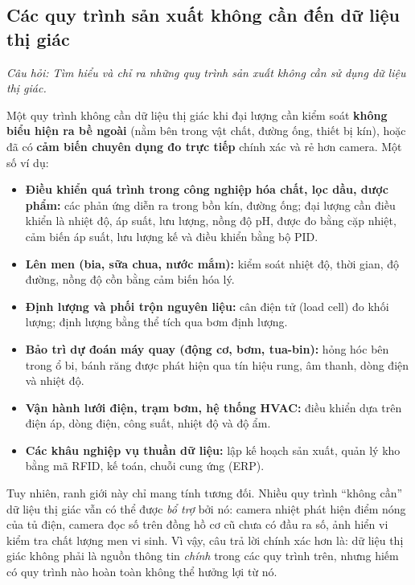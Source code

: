 \subsection{Các quy trình sản xuất không cần đến dữ liệu thị giác}
\label{subsec:w1_novisual}

\textit{Câu hỏi: Tìm hiểu và chỉ ra những quy trình sản xuất không cần sử dụng dữ liệu thị giác.}

Một quy trình không cần dữ liệu thị giác khi đại lượng cần kiểm soát \textbf{không biểu hiện ra bề ngoài} (nằm bên trong vật chất, đường ống, thiết bị kín), hoặc đã có \textbf{cảm biến chuyên dụng đo trực tiếp} chính xác và rẻ hơn camera. Một số ví dụ:

\begin{itemize}
    \item \textbf{Điều khiển quá trình trong công nghiệp hóa chất, lọc dầu, dược phẩm:} các phản ứng diễn ra trong bồn kín, đường ống; đại lượng cần điều khiển là nhiệt độ, áp suất, lưu lượng, nồng độ pH, được đo bằng cặp nhiệt, cảm biến áp suất, lưu lượng kế và điều khiển bằng bộ PID.
    \item \textbf{Lên men (bia, sữa chua, nước mắm):} kiểm soát nhiệt độ, thời gian, độ đường, nồng độ cồn bằng cảm biến hóa lý.
    \item \textbf{Định lượng và phối trộn nguyên liệu:} cân điện tử (load cell) đo khối lượng; định lượng bằng thể tích qua bơm định lượng.
    \item \textbf{Bảo trì dự đoán máy quay (động cơ, bơm, tua-bin):} hỏng hóc bên trong ổ bi, bánh răng được phát hiện qua tín hiệu rung, âm thanh, dòng điện và nhiệt độ.
    \item \textbf{Vận hành lưới điện, trạm bơm, hệ thống HVAC:} điều khiển dựa trên điện áp, dòng điện, công suất, nhiệt độ và độ ẩm.
    \item \textbf{Các khâu nghiệp vụ thuần dữ liệu:} lập kế hoạch sản xuất, quản lý kho bằng mã RFID, kế toán, chuỗi cung ứng (ERP).
\end{itemize}

Tuy nhiên, ranh giới này chỉ mang tính tương đối. Nhiều quy trình ``không cần'' dữ liệu thị giác vẫn có thể được \emph{bổ trợ} bởi nó: camera nhiệt phát hiện điểm nóng của tủ điện, camera đọc số trên đồng hồ cơ cũ chưa có đầu ra số, ảnh hiển vi kiểm tra chất lượng men vi sinh. Vì vậy, câu trả lời chính xác hơn là: dữ liệu thị giác không phải là nguồn thông tin \emph{chính} trong các quy trình trên, nhưng hiếm có quy trình nào hoàn toàn không thể hưởng lợi từ nó.


